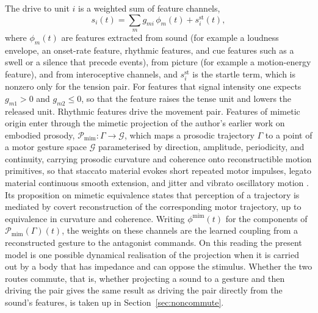 \documentclass[11pt]{article}
\theoremstyle{plain}
\theoremstyle{definition}
\begin{document}
The drive to unit $i$ is a weighted sum of feature channels,
\begin{equation}
s_i(t) = \sum_{m} g_{mi}\,\phi_m(t) + s_i^{\mathrm{st}}(t),
\label{eq:drive}
\end{equation}
where $\phi_m(t)$ are features extracted from sound (for example a loudness envelope, an onset-rate feature, rhythmic features, and cue features such as a swell or a silence that precede events), from picture (for example a motion-energy feature), and from interoceptive channels, and $s_i^{\mathrm{st}}$ is the startle term, which is nonzero only for the tension pair. For features that signal intensity one expects $g_{m1}>0$ and $g_{m2}\le 0$, so that the feature raises the tense unit and lowers the released unit. Rhythmic features drive the movement pair. Features of mimetic origin enter through the mimetic projection of the author's earlier work on embodied prosody, $\mathcal{P}_{\mathrm{mim}}:\Gamma\to\mathcal{G}$, which maps a prosodic trajectory $\Gamma$ to a point of a motor gesture space $\mathcal{G}$ parameterised by direction, amplitude, periodicity, and continuity, carrying prosodic curvature and coherence onto reconstructible motion primitives, so that staccato material evokes short repeated motor impulses, legato material continuous smooth extension, and jitter and vibrato oscillatory motion \citep{flyxion2026}. Its proposition on mimetic equivalence states that perception of a trajectory is mediated by covert reconstruction of the corresponding motor trajectory, up to equivalence in curvature and coherence. Writing $\phi^{\mathrm{mim}}(t)$ for the components of $\mathcal{P}_{\mathrm{mim}}(\Gamma)(t)$, the weights on these channels are the learned coupling from a reconstructed gesture to the antagonist commands. On this reading the present model is one possible dynamical realisation of the projection when it is carried out by a body that has impedance and can oppose the stimulus. Whether the two routes commute, that is, whether projecting a sound to a gesture and then driving the pair gives the same result as driving the pair directly from the sound's features, is taken up in Section~\ref{sec:noncommute}.
\end{document}
